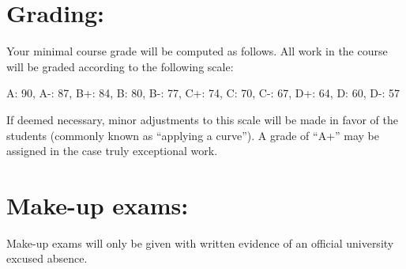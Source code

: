 \documentclass[margin]{res}
\theoremstyle{plain}
\theoremstyle{definition}
\theoremstyle{remark}
\begin{document}
\begin{resume}
\section{Grading:}
Your minimal course grade will be computed as follows. All work in the course will be graded according to the following scale:

A: 90,
A-: 87,
B+: 84,
B: 80,
B-: 77,
C+: 74,
C: 70,
C-: 67,
D+: 64,
D: 60,
D-: 57


If deemed necessary, minor adjustments to this scale will be made in favor of the students (commonly known as ``applying a curve'').  A grade of ``A+'' may be assigned in the case truly exceptional work.




\section{Make-up exams:}
Make-up exams will only be given with written evidence of an official university
excused absence. 


\end{resume}
\end{document}
